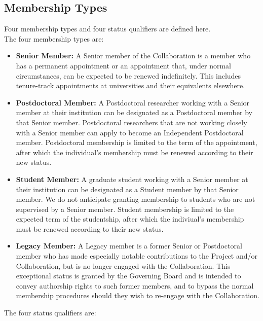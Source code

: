 \documentclass[12pt]{article}
\begin{document}
\subsection{Membership Types}
\label{sec:memtypes}

Four membership types and four status qualifiers are defined here. \\

\noindent The four membership types are:
\begin{itemize}

\item {\bf Senior Member:}
A Senior member of the Collaboration is a member who has a permanent appointment or an appointment that, under normal circumstances, can be expected to be renewed indefinitely.  This includes tenure-track appointments at universities and their equivalents elsewhere.

\item {\bf Postdoctoral Member:}
A Postdoctoral researcher working with a Senior member at their institution can be designated as a Postdoctoral member by that Senior member. Postdoctoral researchers that are not working closely with a Senior member can apply to become an Independent Postdoctoral member. Postdoctoral membership is limited to the term of the appointment, after which the individual's membership must be renewed according to their new status.

\item {\bf Student Member:}
A graduate student working with a Senior member at their institution can be designated as a Student member by that Senior member.  We do not anticipate granting membership to students who are not supervised by a Senior member. Student membership is limited to the expected term of the studentship, after which the indiviual's membership must be renewed according to their new status.

\item {\bf Legacy Member:}
A Legacy member is a former Senior or Postdoctoral member who has made especially notable contributions to the Project and/or Collaboration, but is no longer engaged with the Collaboration. This exceptional status is granted by the Governing Board and is intended to convey authorship rights to such former members, and to bypass the normal membership procedures should they wish to re-engage with the Collaboration.

\end{itemize}

\vspace*{0.1in}
\noindent
The four status qualifiers are:
\end{document}
